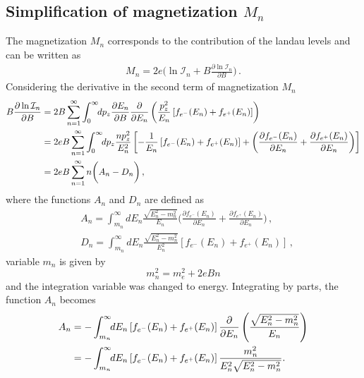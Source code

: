 \documentclass[sn-mathphys,Numbered]{sn-jnl}
\begin{document}
\subsection{Simplification of magnetization $M_n$}
The magnetization $M_n$ corresponds to the contribution of the landau levels and can be written as
\begin{align}
M_n=2e\bigg(\ln\mathcal{I}_{n}+B\frac{\partial\ln\mathcal{I}_n}{\partial B}\bigg)\,.
\end{align}
Considering the derivative in the second term of magnetization $M_n$
\begin{align}
B\frac{\partial\ln\mathcal{I}_n}{\partial B}&=2B \sum_{n=1}^\infty\int_0^\infty\!\!dp_z \frac{\partial E_n}{\partial B}\frac{\partial}{\partial E_n}\left(\frac{p_z^2}{E_{n}}\left[f_{e^-}(E_n)+f_{e^+}(E_n)\right]\right)\notag\\
&=2eB \sum_{n=1}^\infty\int_0^\infty\!\!dp_z \frac{n p_z^2}{E^2_{n}}\left[-\frac{1}{E_{n}}\left[f_{e^-}(E_n)+f_{e^+}(E_n)\right]+\left(\frac{\partial f_{e^-}(E_n)}{\partial E_n}+\frac{\partial f_{e^+}(E_n)}{\partial E_n}\right)\right]\notag\\
&=2eB\sum_{n=1}^\infty n\bigg(A_n-D_n\bigg)\,,\label{Eq001_appendix}
\end{align}
where the functions $A_n$ and $D_n$ are defined as
\begin{align}
\label{Function_A}
&A_n=\int_{m_n}^\infty\!\!dE_n \frac{\sqrt{E^2_n-m^2_n}}{E_{n}}\bigg(\frac{\partial f_{e^-}(E_n)}{\partial E_n}+\frac{\partial f_{e^+}(E_n)}{\partial E_n}\bigg)\,,\\ 
\label{Function_D}
&D_n=\int_{m_n}^\infty\!\!dE_n \frac{\sqrt{E^2_n-m^2_n}}{E^2_{n}}\left[f_{e^-}(E_n)+f_{e^+}(E_n)\right]\,,
\end{align}
variable $m_n$ is given by
\begin{equation}
    m_n^2 = m^2_e+2eBn
\end{equation}
and the integration variable was changed to energy. Integrating by parts, the function $A_n$ becomes
\begin{align}
A_n&=-\int_{m_n}^\infty\!\!dE_n \left[f_{e^-}(E_n)+f_{e^+}(E_n)\right]\frac{\partial}{\partial E_n}\left(\frac{\sqrt{E^2_n-m^2_n}}{E_{n}}\right)\notag\\
&=-\int_{m_n}^\infty\!\!dE_n \left[f_{e^-}(E_n)+f_{e^+}(E_n)\right]\frac{m^2_n}{E^2_{n}\sqrt{E^2_n-m^2_n}}.
\end{align}
\end{document}
